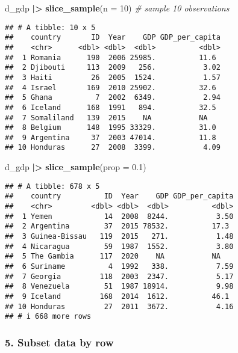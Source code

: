 \documentclass[
]{article}
\newenvironment{Shaded}{\begin{snugshade}}{\end{snugshade}}
\newcommand{\AttributeTok}[1]{\textcolor[rgb]{0.13,0.29,0.53}{#1}}
\newcommand{\CommentTok}[1]{\textcolor[rgb]{0.56,0.35,0.01}{\textit{#1}}}
\newcommand{\DecValTok}[1]{\textcolor[rgb]{0.00,0.00,0.81}{#1}}
\newcommand{\FloatTok}[1]{\textcolor[rgb]{0.00,0.00,0.81}{#1}}
\newcommand{\FunctionTok}[1]{\textcolor[rgb]{0.13,0.29,0.53}{\textbf{#1}}}
\newcommand{\NormalTok}[1]{#1}
\newcommand{\SpecialCharTok}[1]{\textcolor[rgb]{0.81,0.36,0.00}{\textbf{#1}}}
\begin{document}
\begin{Shaded}
\begin{Highlighting}[]
\NormalTok{d\_gdp }\SpecialCharTok{|\textgreater{}}
  \FunctionTok{slice\_sample}\NormalTok{(}\AttributeTok{n =} \DecValTok{10}\NormalTok{) }\CommentTok{\# sample 10 observations}
\end{Highlighting}
\end{Shaded}

\begin{verbatim}
## # A tibble: 10 x 5
##    country       ID  Year    GDP GDP_per_capita
##    <chr>      <dbl> <dbl>  <dbl>          <dbl>
##  1 Romania      190  2006 25985.          11.6 
##  2 Djibouti     113  2009   256.           3.02
##  3 Haiti         26  2005  1524.           1.57
##  4 Israel       169  2010 25902.          32.6 
##  5 Ghana          7  2002  6349.           2.94
##  6 Iceland      168  1991   894.          32.5 
##  7 Somaliland   139  2015    NA           NA   
##  8 Belgium      148  1995 33329.          31.0 
##  9 Argentina     37  2003 47014.          11.8 
## 10 Honduras      27  2008  3399.           4.09
\end{verbatim}

\begin{Shaded}
\begin{Highlighting}[]
\NormalTok{d\_gdp }\SpecialCharTok{|\textgreater{}}
  \FunctionTok{slice\_sample}\NormalTok{(}\AttributeTok{prop =} \FloatTok{0.1}\NormalTok{) }
\end{Highlighting}
\end{Shaded}

\begin{verbatim}
## # A tibble: 678 x 5
##    country          ID  Year    GDP GDP_per_capita
##    <chr>         <dbl> <dbl>  <dbl>          <dbl>
##  1 Yemen            14  2008  8244.           3.50
##  2 Argentina        37  2015 78532.          17.3 
##  3 Guinea-Bissau   119  2015   271.           1.48
##  4 Nicaragua        59  1987  1552.           3.80
##  5 The Gambia      117  2020    NA           NA   
##  6 Suriname          4  1992   338.           7.59
##  7 Georgia         118  2003  2347.           5.17
##  8 Venezuela        51  1987 18914.           9.98
##  9 Iceland         168  2014  1612.          46.1 
## 10 Honduras         27  2011  3672.           4.16
## # i 668 more rows
\end{verbatim}

\hypertarget{subset-data-by-row}{%
\subsubsection{5. Subset data by row}\label{subset-data-by-row}}
\end{document}
